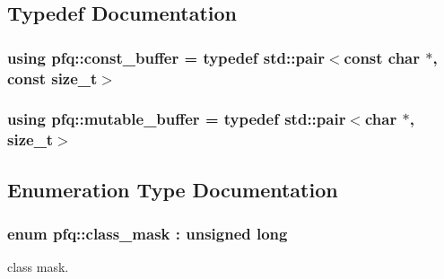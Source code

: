 \subsection{Typedef Documentation}
\hypertarget{namespacepfq_ac835a1bd09b4cbaba61c100b50d0a99f}{
\subsubsection[{const\+\_\+buffer}]{\setlength{\rightskip}{0pt plus 5cm}using {\bf pfq\+::const\+\_\+buffer} = typedef std\+::pair$<$const char $\ast$, const size\+\_\+t$>$}}\label{namespacepfq_ac835a1bd09b4cbaba61c100b50d0a99f}
\hypertarget{namespacepfq_ad7b88920eaf729154354741132483ea8}{
\subsubsection[{mutable\+\_\+buffer}]{\setlength{\rightskip}{0pt plus 5cm}using {\bf pfq\+::mutable\+\_\+buffer} = typedef std\+::pair$<$char $\ast$, size\+\_\+t$>$}}\label{namespacepfq_ad7b88920eaf729154354741132483ea8}


\subsection{Enumeration Type Documentation}
\hypertarget{namespacepfq_a96af1f5ed530eff563eb917516758fbb}{
\subsubsection[{class\+\_\+mask}]{\setlength{\rightskip}{0pt plus 5cm}enum {\bf pfq\+::class\+\_\+mask} \+: unsigned long\hspace{0.3cm}{\ttfamily [strong]}}}\label{namespacepfq_a96af1f5ed530eff563eb917516758fbb}


class mask. 

